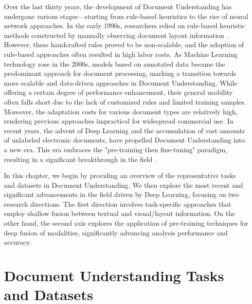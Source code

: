 Over the last thirty years, the development of Document Understanding has undergone various stages—starting from rule-based heuristics to the rise of neural network approaches. In the early 1990s, researchers relied on rule-based heuristic methods constructed by manually observing document layout information \citep{wong1982document, fisher1990rule, lebourgeois1992fast}. However, these handcrafted rules proved to be non-scalable, and the adoption of rule-based approaches often resulted in high labor costs. As Machine Learning technology rose in the 2000s, models based on annotated data \citep{baechler2011multi, wei2013evaluation} became the predominant approach for document processing, marking a transition towards more scalable and data-driven approaches in Document Understanding. While offering a certain degree of performance enhancement, their general usability often falls short due to the lack of customized rules and limited training samples. Moreover, the adaptation costs for various document types are relatively high, rendering previous approaches impractical for widespread commercial use. In recent years, the advent of Deep Learning and the accumulation of vast amounts of unlabeled electronic documents, have propelled Document Understanding into a new era. This era embraces the "pre-training then fine-tuning" paradigm, resulting in a significant breakthrough in the field \citep{xu2020layoutlm, peng2022ernie}.

In this chapter, we begin by providing an overview of the representative tasks and datasets in Document Understanding. We then explore the most recent and significant advancements in the field driven by Deep Learning, focusing on two research directions. The first direction involves task-specific approaches that employ shallow fusion between textual and visual/layout information. On the other hand, the second axis explores the application of pre-training techniques for deep fusion of modalities, significantly advancing analysis performance and accuracy. 


\section{Document Understanding Tasks and Datasets}


